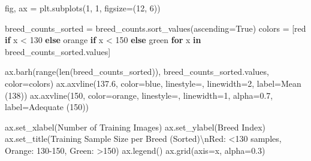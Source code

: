 \documentclass[
  letterpaper,
  DIV=11,
  numbers=noendperiod]{scrartcl}
\newenvironment{Shaded}{\begin{snugshade}}{\end{snugshade}}
\newcommand{\BuiltInTok}[1]{\textcolor[rgb]{0.00,0.23,0.31}{#1}}
\newcommand{\CharTok}[1]{\textcolor[rgb]{0.13,0.47,0.30}{#1}}
\newcommand{\ControlFlowTok}[1]{\textcolor[rgb]{0.00,0.23,0.31}{\textbf{#1}}}
\newcommand{\DecValTok}[1]{\textcolor[rgb]{0.68,0.00,0.00}{#1}}
\newcommand{\FloatTok}[1]{\textcolor[rgb]{0.68,0.00,0.00}{#1}}
\newcommand{\KeywordTok}[1]{\textcolor[rgb]{0.00,0.23,0.31}{\textbf{#1}}}
\newcommand{\NormalTok}[1]{\textcolor[rgb]{0.00,0.23,0.31}{#1}}
\newcommand{\OperatorTok}[1]{\textcolor[rgb]{0.37,0.37,0.37}{#1}}
\newcommand{\StringTok}[1]{\textcolor[rgb]{0.13,0.47,0.30}{#1}}
\newcommand{\VariableTok}[1]{\textcolor[rgb]{0.07,0.07,0.07}{#1}}
\renewenvironment{Shaded}{%
  \begin{tcolorbox}[%
    enhanced,%
    colback=codebg,%
    colframe=codebg,%
    borderline west={3pt}{0pt}{sectionblue},%
    boxrule=0pt,%
    arc=0pt,%
    boxsep=5pt,%
    left=2mm,%
    right=2mm,%
    top=2mm,%
    bottom=2mm%
  ]%
}{%
  \end{tcolorbox}%
}
\begin{document}
\begin{Shaded}
\begin{Highlighting}[]
\NormalTok{fig, ax }\OperatorTok{=}\NormalTok{ plt.subplots(}\DecValTok{1}\NormalTok{, }\DecValTok{1}\NormalTok{, figsize}\OperatorTok{=}\NormalTok{(}\DecValTok{12}\NormalTok{, }\DecValTok{6}\NormalTok{))}

\NormalTok{breed\_counts\_sorted }\OperatorTok{=}\NormalTok{ breed\_counts.sort\_values(ascending}\OperatorTok{=}\VariableTok{True}\NormalTok{)}
\NormalTok{colors }\OperatorTok{=}\NormalTok{ [}\StringTok{\textquotesingle{}red\textquotesingle{}} \ControlFlowTok{if}\NormalTok{ x }\OperatorTok{\textless{}} \DecValTok{130} \ControlFlowTok{else} \StringTok{\textquotesingle{}orange\textquotesingle{}} \ControlFlowTok{if}\NormalTok{ x }\OperatorTok{\textless{}} \DecValTok{150} \ControlFlowTok{else} \StringTok{\textquotesingle{}green\textquotesingle{}} 
          \ControlFlowTok{for}\NormalTok{ x }\KeywordTok{in}\NormalTok{ breed\_counts\_sorted.values]}

\NormalTok{ax.barh(}\BuiltInTok{range}\NormalTok{(}\BuiltInTok{len}\NormalTok{(breed\_counts\_sorted)), breed\_counts\_sorted.values, color}\OperatorTok{=}\NormalTok{colors)}
\NormalTok{ax.axvline(}\FloatTok{137.6}\NormalTok{, color}\OperatorTok{=}\StringTok{\textquotesingle{}blue\textquotesingle{}}\NormalTok{, linestyle}\OperatorTok{=}\StringTok{\textquotesingle{}{-}{-}\textquotesingle{}}\NormalTok{, linewidth}\OperatorTok{=}\DecValTok{2}\NormalTok{, label}\OperatorTok{=}\StringTok{\textquotesingle{}Mean (138)\textquotesingle{}}\NormalTok{)}
\NormalTok{ax.axvline(}\DecValTok{150}\NormalTok{, color}\OperatorTok{=}\StringTok{\textquotesingle{}orange\textquotesingle{}}\NormalTok{, linestyle}\OperatorTok{=}\StringTok{\textquotesingle{}{-}{-}\textquotesingle{}}\NormalTok{, linewidth}\OperatorTok{=}\DecValTok{1}\NormalTok{, alpha}\OperatorTok{=}\FloatTok{0.7}\NormalTok{, label}\OperatorTok{=}\StringTok{\textquotesingle{}Adequate (150)\textquotesingle{}}\NormalTok{)}

\NormalTok{ax.set\_xlabel(}\StringTok{\textquotesingle{}Number of Training Images\textquotesingle{}}\NormalTok{)}
\NormalTok{ax.set\_ylabel(}\StringTok{\textquotesingle{}Breed Index\textquotesingle{}}\NormalTok{)}
\NormalTok{ax.set\_title(}\StringTok{\textquotesingle{}Training Sample Size per Breed (Sorted)}\CharTok{\textbackslash{}n}\StringTok{Red: \textless{}130 samples, Orange: 130{-}150, Green: \textgreater{}150\textquotesingle{}}\NormalTok{)}
\NormalTok{ax.legend()}
\NormalTok{ax.grid(axis}\OperatorTok{=}\StringTok{\textquotesingle{}x\textquotesingle{}}\NormalTok{, alpha}\OperatorTok{=}\FloatTok{0.3}\NormalTok{)}


\end{Highlighting}
\end{Shaded}
\end{document}

